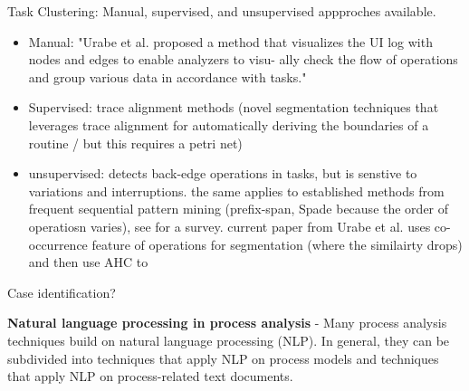 Task Clustering: Manual, supervised, and unsupervised appproches available.
\begin{itemize}
\item Manual: "Urabe et al. proposed a method that visualizes the UI log with nodes and edges to enable analyzers to visu- ally check the flow of operations and group various data in accordance with tasks." \cite{urabe2019visualizing}
\item Supervised: trace alignment methods \cite{agostinelli202111} (novel segmentation techniques that leverages trace alignment for automatically deriving the boundaries of a routine / but this requires a petri net)  
\item unsupervised: \cite{leno2020identifying} detects back-edge operations in tasks, but is senstive to variations and interruptions. the same applies to established methods from frequent sequential pattern mining (prefix-span, Spade because the order of operatiosn varies), see \cite{fournier2017survey} for a survey. current paper from Urabe et al. \cite{Urabe21} uses co-occurrence feature of operations for segmentation (where the similairty drops) and then use AHC to 
\end{itemize}
 
Case identification?





\textbf{Natural language processing in process analysis} - Many process analysis techniques build on natural language processing (NLP). In general, they can be subdivided into techniques that apply NLP on process models and techniques that apply NLP on process-related text documents. 

